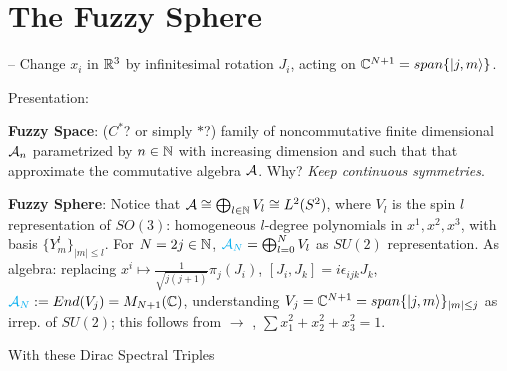 \lin 



\section{The Fuzzy Sphere}

 -- Change $x_i$ in $\mathbb{R}^3$ by infinitesimal rotation $J_i$, acting on $\mathbb{C}^{N+1} = span\{|j, m\rangle\}$.

Presentation:

\textbf{Fuzzy Space}: ($C^*$? or simply $*$?\todo{}) 
    family of noncommutative finite dimensional $\mathcal A_n$ parametrized by $n \in \mathbb{N}$ with increasing dimension and such that that approximate the commutative algebra $\mathcal A$. Why? \textit{Keep continuous symmetries}.
    
    \textbf{Fuzzy Sphere}: Notice that $\mathcal A \cong \bigoplus_{l \in \mathbb{N}} V_l \cong L^2(S^2)$, where $V_l$ is the spin $l$ representation of $SO(3)$: homogeneous $l$-degree polynomials in $x^1, x^2, x^3$, with basis $\{Y^l_m\}_{|m| \leq l}$. 
    For $N = 2j \in \mathbb{N}$, 
    $\textcolor{cyan}{\mathcal A_N}= \bigoplus_{l = 0}^N V_l$ as $SU(2)$ representation. 
    As algebra: replacing $x^i \mapsto \frac{1}{\sqrt{j(j+1)}} \pi_{j}(J_i)$, $[J_i, J_k] = i \epsilon_{ijk} J_k$, $\textcolor{cyan}{\mathcal A_N} := End(V_j) = M_{N+1}(\mathbb{C})$, understanding $V_j= \mathbb{C}^{N+1} = span\{|j, m\rangle\}_{|m| \leq j}$ as irrep. of $SU(2)$; this follows from  $\longrightarrow$ , $\sum x_1^2 + x_2^2 + x_3^2 = 1$.
    
    With these Dirac Spectral Triples \cite{DAndrea2013} 
    
    
    
